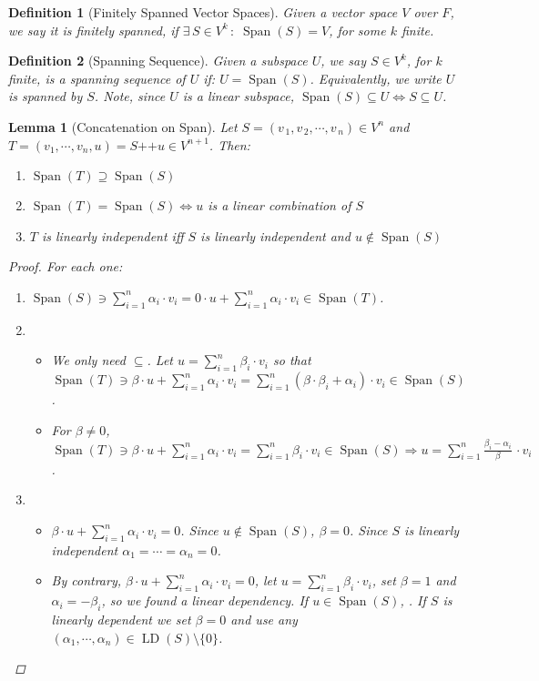\documentclass[12pt]{article}
\let\RA\Rightarrow
\let\LA\Leftarrow
\let\LR\Leftrightarrow
\newcommand{\Exist}[1]{\exists\,{#1}\,:\;}
\newcommand{\seq}[2]{\left({#1}_{\,1},{#1}_{\,2},\cdots,{#1}_{\,#2}\right)}
\DeclareMathOperator{\Span}{Span}
\DeclareMathOperator{\LD}{LD}
\DeclareMathOperator{\concat}{++}
\newtheorem{definition}{Definition}[subsection]
\newtheorem{lemma}{Lemma}[subsection]
\begin{document}
\begin{definition}[Finitely Spanned Vector Spaces]
  Given a vector space $V$ over $F$, we say it is finitely spanned, if $\Exist{S\in V^k} \Span(S)=V$, for some $k$ finite.
\end{definition}

\begin{definition}[Spanning Sequence]
  Given a subspace $U$, we say $S\in V^k$, for $k$ finite, is a spanning sequence of $U$ if: $U=\Span(S)$. Equivalently, we write $U$ is spanned by $S$. Note, since $U$ is a linear subspace, $\Span(S)\subseteq U\LR S\subseteq U$.
\end{definition}

\begin{lemma}[Concatenation on Span]
  Let $S=\seq{v}{n}\in V^n$ and $T=\left(v_1,\cdots,v_n,u\right)=S\concat u\in V^{n+1}$. Then:
  \begin{enumerate}
    \item $\Span(T)\supseteq \Span(S)$
    \item $\Span(T)=\Span(S)\LR u$ is a linear combination of $S$
    \item $T$ is linearly independent iff $S$ is linearly independent and $u\notin\Span(S)$
  \end{enumerate}
  \begin{proof}
    For each one:
    \begin{enumerate}
      \item $\displaystyle \Span(S)\ni \sum_{i=1}^n \alpha_i\cdot v_i=0\cdot u+\sum_{i=1}^n \alpha_i\cdot v_i\in \Span(T)$.
      \item 
      \begin{itemize}
        \item[$(\LA)$] We only need $\subseteq$. Let $\displaystyle u=\sum_{i=1}^n \beta_i\cdot v_i$ so that $\displaystyle \Span(T)\ni \beta\cdot u+\sum_{i=1}^n \alpha_i\cdot v_i=\sum_{i=1}^n (\beta\cdot \beta_i+\alpha_i)\cdot v_i\in\Span(S)$.
        \item[$(\RA)$] For $\beta\neq 0$, $\displaystyle \Span(T)\ni \beta\cdot u+\sum_{i=1}^n \alpha_i\cdot v_i=\sum_{i=1}^n \beta_i\cdot v_i\in \Span(S)\RA u=\sum_{i=1}^n\frac{\beta_i-\alpha_i}{\beta}\,\cdot v_i$.
      \end{itemize}
      \item 
      \begin{itemize}
        \item[$(\LA)$] $\displaystyle \beta\cdot u+\sum_{i=1}^n \alpha_i\cdot v_i=0$. Since $u\notin\Span(S)$, $\beta=0$. Since $S$ is linearly independent $\alpha_1=\cdots=\alpha_n=0$.
        \item[$(\RA)$] By contrary, $\displaystyle \beta\cdot u+\sum_{i=1}^n \alpha_i\cdot v_i=0$, let $\displaystyle u=\sum_{i=1}^n \beta_i\cdot v_i$, set $\beta=1$ and $\alpha_i=-\beta_i$, so we found a linear dependency. If $u\in\Span(S)$, . If $S$ is linearly dependent we set $\beta=0$ and use any $(\alpha_1,\cdots,\alpha_n)\in \LD(S)\setminus\{0\}$. 
      \end{itemize}
    \end{enumerate}
  \end{proof}
\end{lemma}
\end{document}
